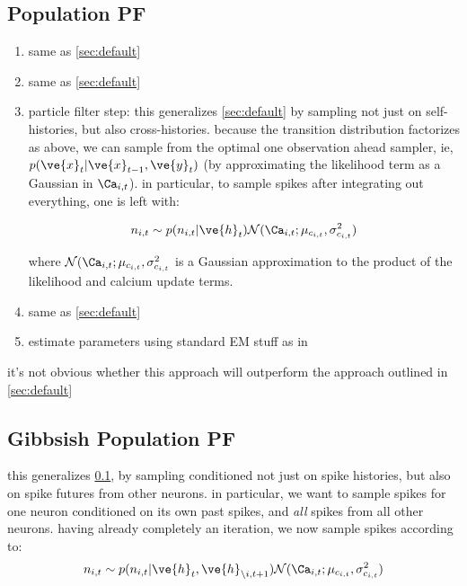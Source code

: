 \documentclass[12pt]{article}
\newcommand{\x}{\ve{x}}
\newcommand{\y}{\ve{y}}
\newcommand{\h}{\ve{h}}
\begin{document}
\subsection{Population PF} \label{sec:PopPF}

\begin{enumerate}
\item same as \ref{sec:default}
\item same as \ref{sec:default}
\item particle filter step: this generalizes \ref{sec:default} by sampling not just on self-histories, but also cross-histories.  because the transition distribution factorizes as above, we can sample from the optimal one observation ahead sampler, ie, $p(\x_t | \x_{t-1}, \y_t)$ (by approximating the likelihood term as a Gaussian in $\Ca_{i,t}$). in particular, to sample spikes after integrating out everything, one is left with:

\begin{align}
n_{i,t} \sim p(n_{i,t} | \h_t) \mathcal{N}(\Ca_{i,t}; \mu_{c_{i,t}}, \sigma_{c_{i,t}}^2)
\end{align}  

\noindent where $\mathcal{N}(\Ca_{i,t}; \mu_{c_{i,t}}, \sigma_{c_{i,t}}^2$ is a Gaussian approximation to the product of the likelihood and calcium update terms.  

\item same as \ref{sec:default}
\item estimate parameters using standard EM stuff as in \cite{BJ08}
\end{enumerate}

it's not obvious whether this approach will outperform the approach outlined in \ref{sec:default}

\subsection{Gibbsish Population PF} \label{sec:G1PF}

this generalizes \ref{sec:PopPF}, by sampling conditioned not just on spike histories, but also on spike futures from other neurons.  in particular, we want to sample spikes for one neuron conditioned on its own past spikes, and \emph{all} spikes from all other neurons.  having already completely an iteration, we now sample spikes according to:
\begin{align}
n_{i,t} \sim p(n_{i,t} | \h_t, \h_{\backslash i, t+1}) \mathcal{N}(\Ca_{i,t}; \mu_{c_{i,t}}, \sigma^2_{c_{i,t}})
\end{align}
\end{document}
